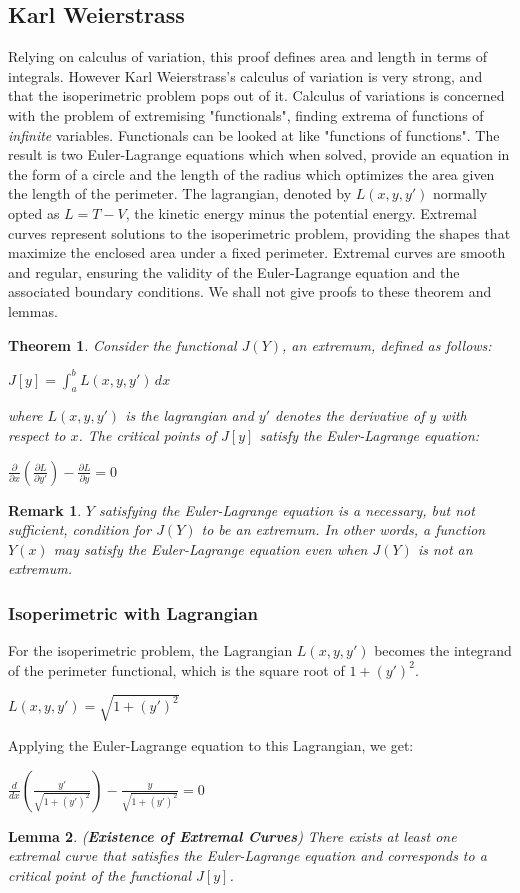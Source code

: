 \documentclass[a4paper]{book}
\newtheorem{theorem}{Theorem}%
\newtheorem{lemma}[theorem]{Lemma}%
\newtheorem{remark}{Remark}%
\begin{document}
\subsection{Karl Weierstrass}
Relying on calculus of variation, this proof defines area and length in terms of integrals. However Karl Weierstrass's calculus of variation is very strong, and that the isoperimetric problem pops out of it. Calculus of variations is concerned with the problem of extremising "functionals", finding extrema of functions of \textit{infinite} variables. Functionals can be looked at like "functions of functions". The result is two Euler-Lagrange equations which when solved, provide an equation in the form of a circle and the length of the radius which optimizes the area given the length of the perimeter. The lagrangian, denoted by $L(x,y,y')$ normally opted as $L=T-V$, the kinetic energy minus the potential energy. Extremal curves represent solutions to the isoperimetric problem, providing the shapes that maximize the enclosed area under a fixed perimeter. Extremal curves are smooth and regular, ensuring the validity of the Euler-Lagrange equation and the associated boundary conditions. We shall not give proofs to these theorem and lemmas.
\begin{theorem}
	Consider the functional $J(Y)$, an extremum, defined as follows:
	\begin{center}
		$J[y]=\int_{a}^{b}L(x,y,y')\,dx$
	\end{center}
	where $L(x,y,y')$ is the lagrangian and $y'$ denotes the derivative of $y$ with respect to $x$. The critical points of $J[y]$ satisfy the Euler-Lagrange equation:
	\begin{center}
		$\frac{\partial}{\partial x}(\frac{\partial L}{\partial y'})-\frac{\partial L}{\partial y}=0$
	\end{center}
\end{theorem}
\begin{remark}
	$Y$ satisfying the Euler-Lagrange equation is a necessary, but not sufficient, condition for $J(Y)$ to be an extremum. In other words, a function $Y(x)$ may satisfy the Euler-Lagrange equation even when $J(Y)$ is not an extremum.
\end{remark}
\subsubsection{Isoperimetric with Lagrangian}
For the isoperimetric problem, the Lagrangian $L(x, y, y')$ becomes the integrand of the perimeter functional, which is the square root of $1 + (y')^2$.
\begin{center}
	$L(x, y, y') = \sqrt{1 + (y')^2}$
\end{center}
Applying the Euler-Lagrange equation to this Lagrangian, we get:
\begin{center}
	$\frac{d}{dx} \left( \frac{y'}{\sqrt{1 + (y')^2}} \right) - \frac{y}{\sqrt{1 + (y')^2}} = 0$
\end{center}
\begin{lemma}(\textbf{Existence of Extremal Curves})
        There exists at least one extremal curve that satisfies the Euler-Lagrange equation and corresponds to a critical point of the functional \( J[y] \).
    \end{lemma}
\end{document}
